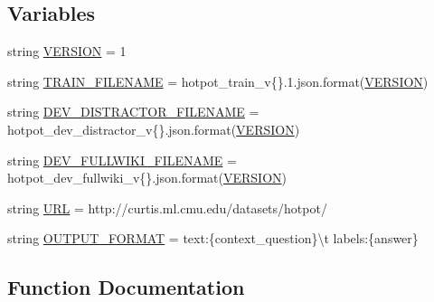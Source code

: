 \subsection*{Variables}
\begin{DoxyCompactItemize}
\item 
string \hyperlink{namespaceparlai_1_1tasks_1_1hotpotqa_1_1build_a57a5627d2111821eb32c42f113773b1a}{V\+E\+R\+S\+I\+ON} = \textquotesingle{}1\textquotesingle{}
\item 
string \hyperlink{namespaceparlai_1_1tasks_1_1hotpotqa_1_1build_a8987e1381df8f7e74c98455c4af7d1e8}{T\+R\+A\+I\+N\+\_\+\+F\+I\+L\+E\+N\+A\+ME} = \textquotesingle{}hotpot\+\_\+train\+\_\+v\{\}.\+1.json\textquotesingle{}.format(\hyperlink{namespaceparlai_1_1tasks_1_1hotpotqa_1_1build_a57a5627d2111821eb32c42f113773b1a}{V\+E\+R\+S\+I\+ON})
\item 
string \hyperlink{namespaceparlai_1_1tasks_1_1hotpotqa_1_1build_a86adac1f9e9da2911e21beaafefc2cee}{D\+E\+V\+\_\+\+D\+I\+S\+T\+R\+A\+C\+T\+O\+R\+\_\+\+F\+I\+L\+E\+N\+A\+ME} = \textquotesingle{}hotpot\+\_\+dev\+\_\+distractor\+\_\+v\{\}.json\textquotesingle{}.format(\hyperlink{namespaceparlai_1_1tasks_1_1hotpotqa_1_1build_a57a5627d2111821eb32c42f113773b1a}{V\+E\+R\+S\+I\+ON})
\item 
string \hyperlink{namespaceparlai_1_1tasks_1_1hotpotqa_1_1build_aabcca98f76be2304d8393dcf7ddc6648}{D\+E\+V\+\_\+\+F\+U\+L\+L\+W\+I\+K\+I\+\_\+\+F\+I\+L\+E\+N\+A\+ME} = \textquotesingle{}hotpot\+\_\+dev\+\_\+fullwiki\+\_\+v\{\}.json\textquotesingle{}.format(\hyperlink{namespaceparlai_1_1tasks_1_1hotpotqa_1_1build_a57a5627d2111821eb32c42f113773b1a}{V\+E\+R\+S\+I\+ON})
\item 
string \hyperlink{namespaceparlai_1_1tasks_1_1hotpotqa_1_1build_a2438adc99c7352b4e33e6153b45e24e7}{U\+RL} = \textquotesingle{}http\+://curtis.\+ml.\+cmu.\+edu/datasets/hotpot/\textquotesingle{}
\item 
string \hyperlink{namespaceparlai_1_1tasks_1_1hotpotqa_1_1build_a48edb524c1cd509f9b1707f70aed4003}{O\+U\+T\+P\+U\+T\+\_\+\+F\+O\+R\+M\+AT} = \textquotesingle{}text\+:\{context\+\_\+question\}\textbackslash{}t\textquotesingle{} \textquotesingle{}labels\+:\{answer\}\textquotesingle{}
\end{DoxyCompactItemize}


\subsection{Function Documentation}
\mbox{\label{namespaceparlai_1_1tasks_1_1hotpotqa_1_1build_a98853aa474b04fb50fa49cec3f1c3882}} 
